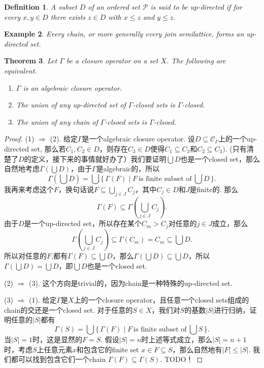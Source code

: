 \documentclass{article}
\newtheorem{theorem}{Theorem}[section]
\newtheorem{example}[theorem]{Example}
\newtheorem{definition}[theorem]{Definition}
\newcommand\Set[2]{\{\,#1\mid#2\,\}} %
\begin{document}
\newpage
\begin{definition}
\rm A subset $D$ of an ordered set $\mathcal{P}$ is said to be {\color{red} \emph{up-directed}} if for every $x,y \in D$ there exists $z \in D$ with $x \leq z$ and $y \leq z$.
\end{definition}

\begin{example}
\rm Every chain, or more generally every join semilattice, forms an up-directed set.
\end{example}

\begin{theorem}
\rm Let $\Gamma$ be a closure operator on a set $X$. The following are equivalent.
\begin{enumerate}
	\item $\Gamma$ is an algebraic closure operator.
	\item The union of any up-directed set of $\Gamma$-closed sets is $\Gamma$-closed. 
	\item The union of any chain of $\Gamma$-clsoed sets is $\Gamma$-clsoed.
\end{enumerate}
\end{theorem}

\begin{proof}
(1) $\Rightarrow$ (2). 给定$\Gamma$是一个algebraic closure operator. 设$D \subseteq \mathcal{C}_{\Gamma}$上的一个up-directed set, 那么若$C_1,C_2 \in D$，则存在$C_3 \in D$使得$C_1 \subseteq C_3$和$C_2 \subseteq C_3)$. (只有清楚了$D$的定义，接下来的事情就好办了）我们要证明$\bigcup D$也是一个closed set，那么自然地考虑$\Gamma(\bigcup D)$，由于$\Gamma$是algebraic的，所以
$$
\Gamma(\bigcup D) = \bigcup \Set{\Gamma(F)}{F\ \text{is finite subset of}\ \bigcup D}.
$$
我再来考虑这个$F$，换句话说$F \subseteq \bigcup\limits_{j \in J} C_j$，其中$C_j \in D$和$J$是finite的. 那么
$$
\Gamma(F) \subseteq \Gamma(\bigcup\limits_{j \in J} C_j). 
$$
由于$D$是一个up-directed set，所以存在某个$C_m > C_j$对任意的$j \in J$成立，那么
$$
\Gamma(\bigcup\limits_{j \in J} C_j) \subseteq \Gamma(C_m) = C_m \subseteq \bigcup D.
$$
所以对任意的$F$,都有$\Gamma(F) \subseteq \bigcup D$，那么$\Gamma(\bigcup D) \subseteq \bigcup D$，所以$\Gamma(\bigcup D) = \bigcup D$，即$\bigcup D$也是一个closed set.

(2) $\Rightarrow$ (3). 这个方向是trivial的，因为chain是一种特殊的up-directed set.

(3) $\Rightarrow$ (1). 给定$\Gamma$是$X$上的一个closure operator，且任意一个closed sets组成的chain的交还是一个closed set. 对于任意的$S \in X$，我们对$S$的基数$|S|$进行归纳，证明任意的$|S|$都有
$$
\Gamma(S) = \bigcup \Set{\Gamma(F)}{F\ \text{is finite subset of}\ \bigcup S}.
$$
当$|S|=1$时，这是显然的$F=S$. 假设$|S| = n$时上述等式成立，那么$|S| = n+1$时，考虑$S$上任意元素$x$和包含它的finite set $x \in F \subseteq S$，那么自然地有$|F| \leq |S|$. 我们都可以找到包含它们一个chain $\Gamma(F) \subseteq \Gamma(S)$. TODO！
\end{proof}
\end{document}
